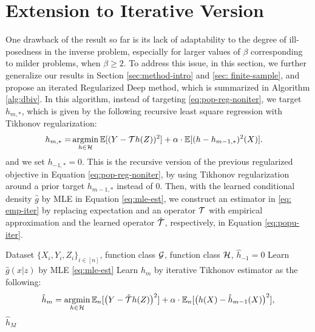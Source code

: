 \vspace{-2mm}
\section{Extension to Iterative Version}\label{sec: iterative}
\vspace{-2mm}


One drawback of the result so far is its lack of adaptability to the degree of ill-posedness in the inverse problem, especially for larger values of $\beta$ corresponding to milder problems, when $\beta \geq 2$. To address this issue, in this section, we further generalize our results in Section \ref{sec:method-intro} and \ref{sec: finite-sample}, and propose an iterated Regularized Deep method, which is summarized in Algorithm \ref{alg:dbiv}. In this algorithm, instead of targeting \eqref{eq:pop-reg-noniter}, we target $h_{m, *}$, which is given by the following recursive least square regression with Tikhonov regularization: \begin{align}\label{eq:popu-iter}
    h_{m, *} = &\mathop{\mathrm{argmin}}_{h\in\mathcal{H}} \mathbb{E}[(Y - {\mathcal{T}} h(Z))^2]+ \alpha\cdot \mathbb{E}[(h - h_{m-1,*})^2(X)].
\end{align}
and we set $h_{-1,*} = 0$. This is the recursive version of the previous regularized objective in Equation \eqref{eq:pop-reg-noniter}, by using Tikhonov regularization around a prior target $h_{m-1,*}$ instead of $0$. Then, with the learned conditional density $\hat{g}$ by MLE in Equation \eqref{eq:mle-est}, we construct an estimator in \eqref{eq: emp-iter} by replacing expectation and an operator ${\mathcal{T}}$ with empirical approximation and the learned operator $\hat {{\mathcal{T}}}$, respectively, in Equation \eqref{eq:popu-iter}. 

\begin{algorithm}[!t]
\caption{Iterative Regularized Deep IV}
\begin{algorithmic}[1]\label{alg:dbiv}
        \REQUIRE Dataset $\{X_i,Y_i,Z_i\}_{i\in[n]}$, function class $\mathcal{G}$, function class $\mathcal{H}$, $\hat{h}_{-1} = 0$
        \STATE Learn $\hat{g}(x|z)$ by MLE \eqref{eq:mle-est}
        \STATE   Learn $\hat{h}_m$ by iterative Tikhonov estimator as the following:
        \begin{align}\label{eq: emp-iter}
    \hat{h}_{m}=\mathop{\mathrm{argmin}}_{h\in\mathcal{H}} \mathbb{E}_n[\big(Y - \hat{{\mathcal{T}}} h(Z)\big)^2]+ \alpha \cdot \mathbb{E}_n[\big(h(X) - \hat{h}_{m-1}(X)\big)^2],
\end{align}
        \ENDFOR
        \OUTPUT $\hat h_M$
\end{algorithmic}
\end{algorithm}

